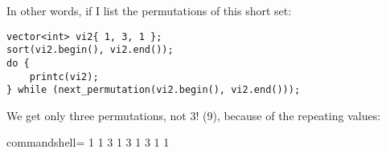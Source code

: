 In other words, if I list the permutations of this short set:

\begin{lstlisting}[style=styleCXX]
vector<int> vi2{ 1, 3, 1 };
sort(vi2.begin(), vi2.end());
do {
	printc(vi2);
} while (next_permutation(vi2.begin(), vi2.end()));
\end{lstlisting}

We get only three permutations, not 3! (9), because of the repeating values:

\begin{tcblisting}{commandshell={}}
1 1 3
1 3 1
3 1 1
\end{tcblisting}






